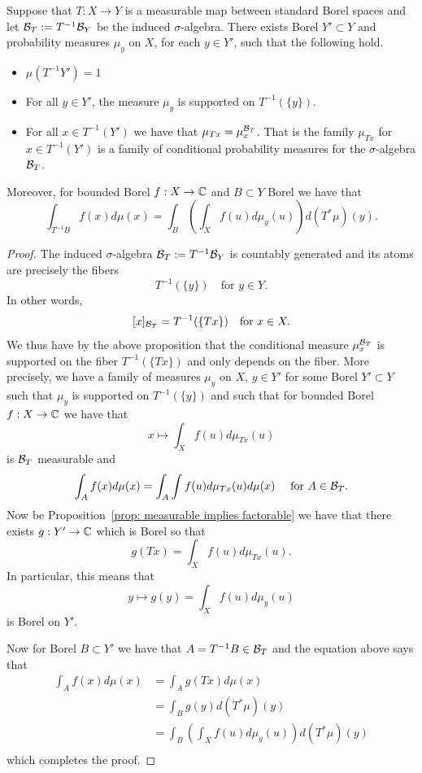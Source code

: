 \documentclass[twoside, a4paper, 10pt]{amsart}
\begin{document}
\begin{thm} Suppose that $T:X\to Y$ is a measurable map between standard Borel spaces and let $\mathcal{B}_T := T^{-1}\mathcal{B}_Y$ be the induced $\sigma$-algebra. There exists Borel $Y' \subset Y$ and probability measures $\mu_y$ on $X$, for each $y \in Y'$, such that the following hold.

\begin{itemize}
	\item $\mu(T^{-1}Y') = 1$
	\item For all $y \in Y'$, the measure $\mu_y$ is supported on $T^{-1}(\{y \})$.
	\item For all $x \in T^{-1}(Y')$ we have that $\mu_{Tx} = \mu_{x}^{\mathcal{B}_T}$. That is the family $\mu_{Tx}$ for $x \in T^{-1}(Y')$ is a family of conditional probability measures for the $\sigma$-algebra $\mathcal{B}_T$.
\end{itemize}

Moreover, for bounded Borel $f: X \to \mathbb{C}$ and $B \subset Y$ Borel we have that $$\int_{T^{-1}B} f(x) d\mu(x) = \int_{B} \left( \int_X f(u) d\mu_y(u) \right) d(T^*\mu)(y).$$

\end{thm}

\begin{proof} The induced $\sigma$-algebra $\mathcal{B}_T := T^{-1}\mathcal{B}_Y$ is countably generated and its atoms are precisely the fibers $$T^{-1}(\{y\}) \quad \text{for } y \in Y.$$ In other words, $$[x]_{\mathcal{B}_T} = T^{-1}(\{ Tx \}) \quad \text{for } x \in X.$$ We thus have by the above proposition that the conditional measure $\mu_{x}^{\mathcal{B}_T}$ is supported on the fiber $T^{-1}(\{Tx\})$ and only depends on the fiber. More precisely, we have a family of measures $\mu_y$ on $X$, $y \in Y'$ for some Borel $Y' \subset Y$ such that $\mu_y$ is supported on $T^{-1}(\{y \})$ and such that for bounded Borel $f:X \to \mathbb{C}$ we have that $$x \mapsto \int_X f(u) d\mu_{Tx}(u)$$ is $\mathcal{B}_T$ measurable and $$\int_A f(x) d\mu(x) = \int_A \int f(u) d\mu_{Tx}(u) d\mu(x) \quad \text{ for } A \in \mathcal{B}_T.$$ Now be Proposition~\ref{prop: measurable implies factorable} we have that there exists $g:Y' \to \mathbb{C}$ which is Borel so that $$g(Tx) = \int_X f(u) d\mu_{Tx}(u).$$ In particular, this means that $$y\mapsto g(y) = \int_X f(u) d\mu_y(u)$$ is Borel on $Y'$. 

Now for Borel $B \subset Y'$ we have that $A= T^{-1}B \in \mathcal{B}_T$ and the equation above says that 
\begin{align*}\int_{A} f(x) d\mu(x) &= \int_A g(Tx) d\mu(x) \\
&= \int_B g(y) d(T^{*}\mu)(y) \\
&= \int_{B} \left( \int_X f(u) d\mu_y(u) \right) d(T^*\mu)(y) \\
\end{align*}   which completes the proof.  \end{proof}
\end{document}
